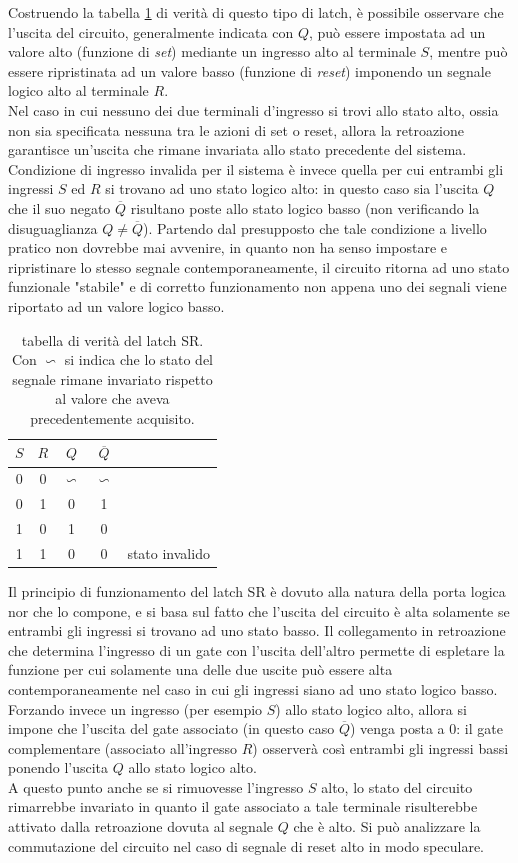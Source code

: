 	Costruendo la tabella \ref{tab:srl:tabellaverita} di verità di questo tipo di latch, è possibile osservare che l'uscita del circuito, generalmente indicata con $Q$, può essere impostata ad un valore alto (funzione di \textit{set}) mediante un ingresso alto al terminale $S$, mentre può essere ripristinata ad un valore basso (funzione di \textit{reset}) imponendo un segnale logico alto al terminale $R$.\\
	Nel caso in cui nessuno dei due terminali d'ingresso si trovi allo stato alto, ossia non sia specificata nessuna tra le azioni di set o reset, allora la retroazione garantisce un'uscita che rimane invariata allo stato precedente del sistema. Condizione di ingresso invalida per il sistema è invece quella per cui entrambi gli ingressi $S$ ed $R$ si trovano ad uno stato logico alto: in questo caso sia l'uscita $Q$ che il suo negato $\overline Q$ risultano poste allo stato logico basso (non verificando la disuguaglianza $Q\neq \overline Q$). Partendo dal presupposto che tale condizione a livello pratico non dovrebbe mai avvenire, in quanto non ha senso impostare e ripristinare lo stesso segnale contemporaneamente, il circuito ritorna ad uno stato funzionale "stabile" e di corretto funzionamento non appena uno dei segnali viene riportato ad un valore logico basso.
	
	
	\begin{table}[bht]
		\centering
		\begin{tabular}{c c | c c  l}
			$S$ & $R$ & $Q$ & $\overline Q$ \\ \hline
			0 & 0 & $\backsim$ & $\backsim$ \\
			0 & 1 & 0 & 1 \\
			1 & 0 & 1 & 0 \\
			1 & 1 & 0 & 0 & stato invalido 			
		\end{tabular}
		\caption{tabella di verità del latch SR. Con $\backsim$ si indica che lo stato del segnale rimane invariato rispetto al valore che aveva precedentemente acquisito.}
		\label{tab:srl:tabellaverita}
	\end{table}
	
	Il principio di funzionamento del latch SR è dovuto alla natura della porta logica nor che lo compone, e si basa sul fatto che l'uscita del circuito è alta solamente se entrambi gli ingressi si trovano ad uno stato basso. Il collegamento in retroazione che determina l'ingresso di un gate con l'uscita dell'altro permette di espletare la funzione per cui solamente una delle due uscite può essere alta contemporaneamente nel caso in cui gli ingressi siano ad uno stato logico basso. Forzando invece un ingresso (per esempio $S$) allo stato logico alto, allora si impone che l'uscita del gate associato (in questo caso $\overline Q$) venga posta a 0: il gate complementare (associato all'ingresso $R$) osserverà così entrambi gli ingressi bassi ponendo l'uscita $Q$ allo stato logico alto.\\
	A questo punto anche se si rimuovesse l'ingresso $S$ alto, lo stato del circuito rimarrebbe invariato in quanto il gate associato a tale terminale risulterebbe attivato dalla retroazione dovuta al segnale $Q$ che è alto. Si può analizzare la commutazione del circuito nel caso di segnale di reset alto in modo speculare.
	
